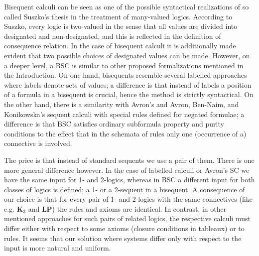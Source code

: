 \documentclass[11pt,a4paper,titlepage]{article}
\theoremstyle{definition}
\newcommand{\3}{\vspace{.3in}}
\newcommand{\2}{\vspace{.2in}}
\newcommand{\1}{\vspace{.1in}}
\newcommand{\5}{\vspace{.05in}}
\begin{document}
Bisequent calculi can be seen as one of the possible syntactical realizations of so called Suszko's thesis \cite{Suszko} in the treatment of many-valued logics. According to Suszko, every logic is two-valued in the sense that all values are divided into designated and non-designated, and this is reflected in the definition of consequence relation. In the case of bisequent calculi it is additionally made evident that two possible choices of designated values can be made. However, on a deeper level, a BSC is similar to other proposed formalizations mentioned in the Introduction. On one hand, bisequents resemble several labelled approaches where labels denote sets of values; a difference is that instead of labels a position of a formula in a bisequent is crucial, hence the method is strictly syntactical. On the other hand, 
there is a similarity with Avron's \cite{Avron} and Avron, Ben-Naim, and Konikowska's \cite{Avron07} sequent calculi with special rules defined for negated formulae; a difference is that BSC satisfies ordinary subformula property and purity conditions to the effect that in the schemata of rules only one (occurrence of a) connective is involved.  

The price is that instead of standard sequents we use a pair of them. There is one more general difference however. In the case of labelled calculi or Avron's SC we have the same input for 1- and 2-logics, whereas in BSC a different input for both classes of logics is defined; a 1- or a 2-sequent in a bisequent. A consequence of our choice is that for every pair of 1- and 2-logics with the same connectives (like e.g. {\bf K$_3$} and {\bf LP}) the rules and axioms are identical. In contrast, in other mentioned approaches for such pairs of related logics, the respective calculi must differ either with respect to some axioms (closure conditions in tableaux) or to rules. It seems that our solution where systems differ only with respect to the input is more natural and uniform.
\end{document}
